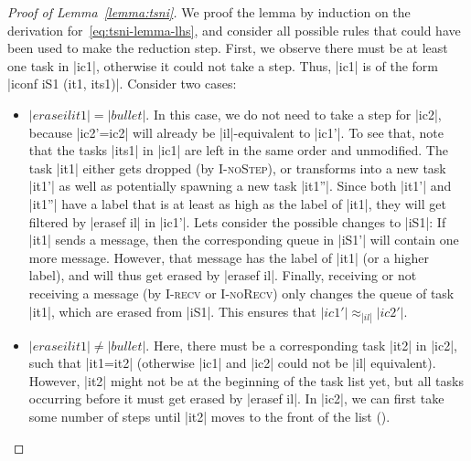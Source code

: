 \begin{proof}[Proof of Lemma~\ref{lemma:tsni}]
  We proof the lemma by induction on the derivation
  for~\eqref{eq:tsni-lemma-lhs}, and consider all possible rules that
  could have been used to make the reduction step.
  First, we observe there must be at least one task in |ic1|, otherwise
  it could not take a step.  Thus, |ic1| is of the form
  |iconf iS1 (it1, its1)|.  Consider two cases:
  \begin{itemize}
    \item $|erase il it1|=|bullet|$. In this case, we do not need to take a
    step for
    |ic2|, because |ic2'=ic2| will already be |il|-equivalent to |ic1'|.
    To see that, note that the tasks |its1| in |ic1| are left in the
    same order and unmodified. The task |it1| either
    gets dropped (by \textsc{I-noStep}), or
    transforms into a new task |it1'| as well as potentially spawning a new
    task |it1''|.  Since both |it1'| and |it1''| have a label that is
    at least as high as the label of |it1|, they will get filtered
    by |erasef il| in |ic1'|.
    Lets consider the possible changes to |iS1|: If |it1| sends a
    message, then the corresponding queue in |iS1'| will contain one
    more message.  However, that message has the label of |it1| (or a higher
    label), and will thus get erased by |erasef il|.
    Finally, receiving or not receiving a message (by
    \textsc{I-recv} or \textsc{I-noRecv}) only changes the queue of
    task |it1|, which are erased from |iS1|.
    This ensures that $|ic1'|\approx_{|il|}|ic2'|$.
    
    \item $|erase il it1|\neq|bullet|$.  Here, there must be a corresponding
    task |it2| in |ic2|,
    such that |it1=it2| (otherwise |ic1| and
    |ic2| could not be |il| equivalent).
    However, |it2| might not be at the beginning of the task list yet, but
    all tasks occurring before it must get erased by |erasef il|.
    In |ic2|, we can first take some number of steps until |it2| moves
    to the front of the list ().
    
    

\end{itemize}
\end{proof}
